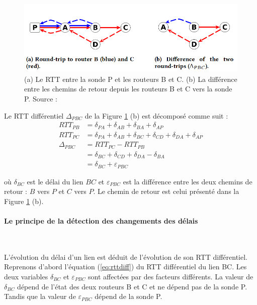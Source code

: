 \begin{figure}[h]
	\centering
	\captionsetup{justification= centering}
	\includegraphics[width=0.7\linewidth]{illustrations/rtt-differ}
	\caption{(a) Le RTT entre la sonde P et les routeurs B et C. (b) La différence entre les  chemins de retour depuis les routeurs B et C vers la sonde P. Source : \cite{DBLP:journals/corr/FontugneAPB16}}
	\label{fig:rtt-differ}
\end{figure} 
Le RTT différentiel $ \Delta_{PBC} $ de la Figure 	\ref{fig:rtt-differ} (b) est décomposé comme suit :
\begin{align}
RTT_{PB} & =  \delta_{PA} + \delta_{AB} + \delta_{BA} + \delta_{AP} \nonumber\\
RTT_{PC} & = \delta_{PA} + \delta_{AB} + \delta_{BC} + \delta_{CD} + \delta_{DA}+ \delta_{AP} \nonumber\\
\Delta_{PBC} & = RTT_{PC} - RTT_{PB}  \label{eq:rttdifference}\\ 
& =  \delta_{BC} + \delta_{CD} + \delta_{DA}- \delta_{BA} \nonumber \\
& = \delta_{BC} + \varepsilon_{PBC} \label{eq:rttdiff}
\end{align}

où $\delta_{BC}$ est le délai du lien $BC$ et $\varepsilon_{PBC}$ est la différence entre les deux chemins de retour : $B$ vers $P$ et $C$ vers $P$.  Le chemin de retour est celui  présenté dans  la Figure \ref{fig:rtt-differ} (b). 


\paragraph{Le principe de la détection des changements des délais}~

L'évolution du délai d'un lien est déduit de l'évolution de son RTT différentiel. Reprenons d'abord l'équation (\ref{eq:rttdiff}) du RTT différentiel du lien BC. Les deux variables $\delta_{BC}$ et $\varepsilon_{PBC}$ sont affectées par des facteurs différents.
La valeur de  $\delta_{BC}$ dépend de l'état des deux routeurs B et C et ne dépend pas de la sonde P. Tandis que la valeur de $\varepsilon_{PBC}$ dépend de la sonde P.

